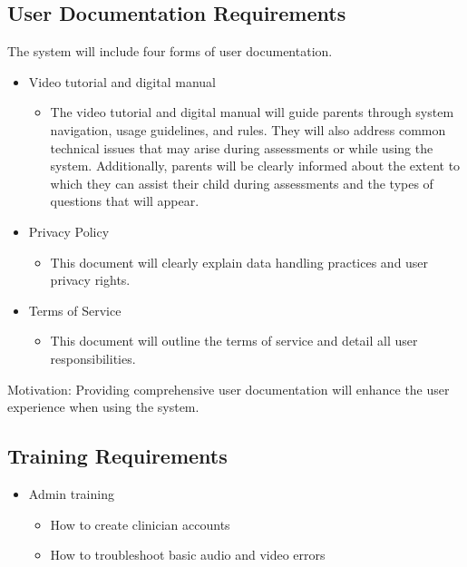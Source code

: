 \documentclass[12pt]{article}
\begin{document}
\subsection{User Documentation Requirements}
\hspace{2em}The system will include four forms of user documentation. 
\begin{itemize}
  \item Video tutorial and digital manual
  \begin{itemize}
    \item The video tutorial and digital manual will guide parents through system navigation, usage guidelines, 
    and rules. They will also address common technical issues that may arise during assessments or 
    while using the system. Additionally, parents will be clearly informed about the extent to 
    which they can assist their child during assessments and the types of questions that will appear.
  \end{itemize}
  \item Privacy Policy
  \begin{itemize}
    \item This document will clearly explain data handling practices and user privacy rights.
  \end{itemize}
  \item Terms of Service
  \begin{itemize}
    \item This document will outline the terms of service and detail all user responsibilities.
  \end{itemize}
\end{itemize}

Motivation: Providing comprehensive user documentation will enhance the user experience when using the system.

\subsection{Training Requirements}
\begin{itemize}
  \item Admin training
  \begin{itemize}
    \item How to create clinician accounts
    \item How to troubleshoot basic audio and video errors
  \end{itemize}
\end{itemize}

\newpage
\end{document}
